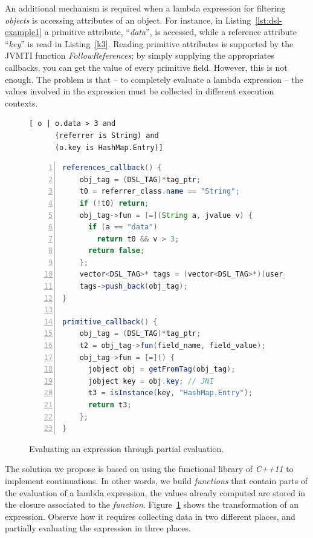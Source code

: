An additional mechanism is required when a lambda expression for filtering \textit{objects} is accessing attributes of an object.
For instance, in Listing~\ref{lst:dsl-example1} a primitive attribute, ``\textit{data}'', is accessed, while a reference attribute ``\textit{key}'' is read in Listing~\ref{k3}.
Reading primitive attributes is supported by the JVMTI function \textit{FollowReferences}; by simply supplying the appropriates callbacks,  you can get the value of every primitive field.
However, this is not enough.
The problem is that -- to completely evaluate a lambda expression -- the values involved in the expression must be collected in different execution contexts.

\begin{figure}[!b]
\centering
\begin{minipage}[t]{0.35\linewidth}
\begin{lstlisting}[language=DSL2]
[ o | o.data > 3 and 
	  (referrer is String) and 
	  (o.key is HashMap.Entry)] 
\end{lstlisting}
\end{minipage}
\hspace{0.07\linewidth}
\begin{minipage}[t]{0.55\linewidth}
\begin{lstlisting}[language=java, frame=L, numbers=left,numberstyle=\color{black}\scriptsize]
references_callback() {
	obj_tag = (DSL_TAG)*tag_ptr;
	t0 = referrer_class.name == "String";
	if (!t0) return;
	obj_tag->fun = [=](String a, jvalue v) { 
	  if (a == "data")
	    return t0 && v > 3;
	  return false;
	};
	vector<DSL_TAG>* tags = (vector<DSL_TAG>*)(user_data);
	tags->push_back(obj_tag);
}

primitive_callback() {
	obj_tag = (DSL_TAG)*tag_ptr;
	t2 = obj_tag->fun(field_name, field_value);
	obj_tag->fun = [=]() { 
	  jobject obj = getFromTag(obj_tag); 
	  jobject key = obj.key; // JNI
	  t3 = isInstance(key, "HashMap.Entry");
	  return t3; 
	};
}
\end{lstlisting}
\end{minipage}
\caption{Evaluating an expression through partial evaluation.} \label{fig:dsl-closures}
\end{figure}

The solution we propose is based on using the functional library of \textit{C++11} to implement continuations.
In other words, we build \textit{functions} that contain parts of the evaluation of a lambda expression, the values already computed are stored in the closure associated to the \textit{function}.
Figure~\ref{fig:dsl-closures} shows the transformation of an expression.
Observe how it requires collecting data in two different places, and partially evaluating the expression in three places.

